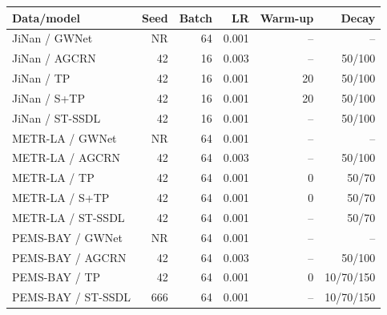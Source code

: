 \begingroup\color{revisionblue}
\sffamily\fontsize{9}{11}\selectfont\renewcommand{\arraystretch}{1.08}\setlength{\tabcolsep}{3pt}
\begin{tabular}{@{}lrrrrr@{}}
\toprule
Data/model & Seed & Batch & LR & Warm-up & Decay \\
\midrule
JiNan / GWNet & NR & 64 & 0.001 & -- & -- \\
JiNan / AGCRN & 42 & 16 & 0.003 & -- & 50/100 \\
JiNan / TP & 42 & 16 & 0.001 & 20 & 50/100 \\
JiNan / S+TP & 42 & 16 & 0.001 & 20 & 50/100 \\
JiNan / ST-SSDL & 42 & 16 & 0.001 & -- & 50/100 \\
METR-LA / GWNet & NR & 64 & 0.001 & -- & -- \\
METR-LA / AGCRN & 42 & 64 & 0.003 & -- & 50/100 \\
METR-LA / TP & 42 & 64 & 0.001 & 0 & 50/70 \\
METR-LA / S+TP & 42 & 64 & 0.001 & 0 & 50/70 \\
METR-LA / ST-SSDL & 42 & 64 & 0.001 & -- & 50/70 \\
PEMS-BAY / GWNet & NR & 64 & 0.001 & -- & -- \\
PEMS-BAY / AGCRN & 42 & 64 & 0.003 & -- & 50/100 \\
PEMS-BAY / TP & 42 & 64 & 0.001 & 0 & 10/70/150 \\
PEMS-BAY / ST-SSDL & 666 & 64 & 0.001 & -- & 10/70/150 \\
\bottomrule
\end{tabular}
\endgroup
